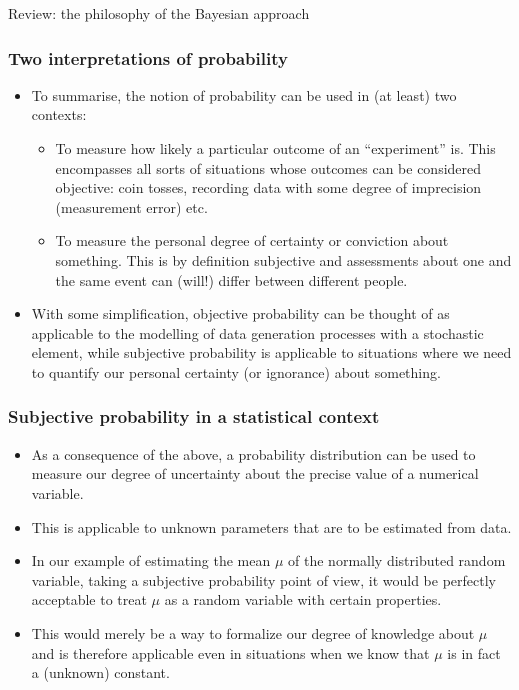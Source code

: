 \documentclass[10pt]{beamer}
\theoremstyle{definition}
\begin{document}
\begin{section}{Review: the philosophy of the Bayesian approach}
\begin{frame}
\frametitle{Two interpretations of probability}
\begin{itemize}\itemsep1em
\item To summarise, the notion of probability can be used in (at least) two contexts:
	\begin{itemize}\itemsep1em
	\item To measure how likely a particular outcome of an ``experiment'' is. This encompasses all sorts of situations whose outcomes can be considered objective: coin tosses, recording data with some degree of imprecision (measurement error) etc.
	\item To measure the personal degree of certainty or conviction about something. This is by definition subjective and assessments about one and the same event can (will!) differ between different people. 
	\end{itemize}
\item With some simplification, objective probability can be thought of as applicable to the modelling of data generation processes with a stochastic element, while subjective probability is applicable to situations where we need to quantify our personal certainty (or ignorance) about something.
\end{itemize}
\end{frame}

\begin{frame}
\frametitle{Subjective probability in a statistical context}
\begin{itemize}\itemsep1em
\item As a consequence of the above, a probability distribution can be used to measure our degree of uncertainty about the precise value of a numerical variable.
\item This is applicable to unknown parameters that are to be estimated from data.
\item In our example of estimating the mean $ \mu $ of the normally distributed random variable, taking a subjective probability point of view, it would be perfectly acceptable to treat $ \mu $ as a random variable with certain properties.
\item This would merely be a way to formalize our degree of knowledge about $ \mu $ and is therefore applicable even in situations when we know that $ \mu $ is in fact a (unknown) constant.
\end{itemize}
\end{frame}


\end{section}
\end{document}
